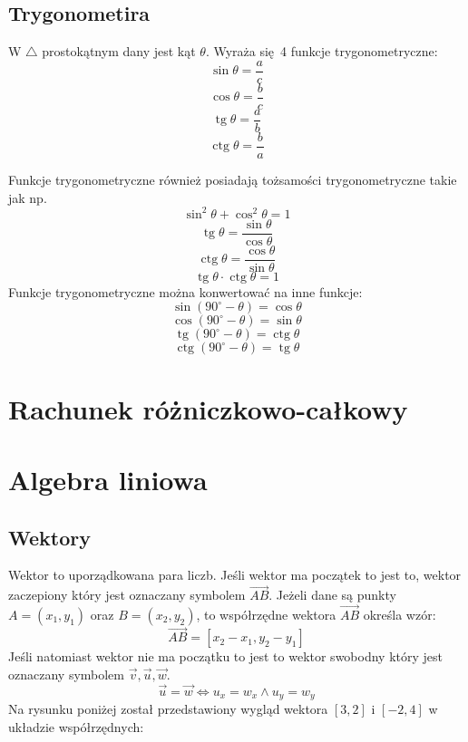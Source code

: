 \documentclass[12pt, a4paper]{article}
\DeclareMathOperator{\tg}{tg}
\DeclareMathOperator{\ctg}{ctg}
\begin{document}
\subsection{Trygonometira}
W $\triangle$ prostokątnym dany jest kąt $\theta$. Wyraża się 4 funkcje trygonometryczne:
$$\sin\theta=\frac{a}{c}$$
$$\cos\theta=\frac{b}{c}$$
$$\tg\theta=\frac{a}{b}$$
$$\ctg\theta=\frac{b}{a}$$
\begin{center}
\end{center}
Funkcje trygonometryczne również posiadają tożsamości trygonometryczne takie jak np.
$$\sin^2\theta+\cos^2\theta = 1$$
$$\tg\theta=\frac{\sin\theta}{\cos\theta}$$
$$\ctg\theta=\frac{\cos\theta}{\sin\theta}$$
$$\tg\theta\cdot\ctg\theta=1$$
Funkcje trygonometryczne można konwertować na inne funkcje:
$$\sin(90^{\circ}-\theta)=\cos\theta$$
$$\cos(90^{\circ}-\theta)=\sin\theta$$
$$\tg(90^{\circ}-\theta)=\ctg\theta$$
$$\ctg(90^{\circ}-\theta)=\tg\theta$$
\section{Rachunek różniczkowo-całkowy}
\section{Algebra liniowa}
\subsection{Wektory}
Wektor to uporządkowana para liczb. Jeśli wektor ma początek to jest to, wektor
zaczepiony który jest oznaczany symbolem $\overrightarrow{AB}$. Jeżeli dane są punkty
$A = (x_1,y_1)$ oraz $B = (x_2,y_2)$,
to współrzędne wektora $\overrightarrow{AB}$ określa wzór: $$\overrightarrow{AB} = [x_2-x_1,y_2-y_1]$$
Jeśli natomiast wektor nie ma początku to jest to wektor swobodny który
jest oznaczany symbolem $\overrightarrow{v}, \overrightarrow{u}, \overrightarrow{w}$.
$$\overrightarrow{u} = \overrightarrow{w} \Longleftrightarrow u_x = w_x \wedge u_y = w_y$$
Na rysunku poniżej został przedstawiony wygląd wektora $[3,2]$ i $[-2,4]$ w układzie współrzędnych:
\end{document}
